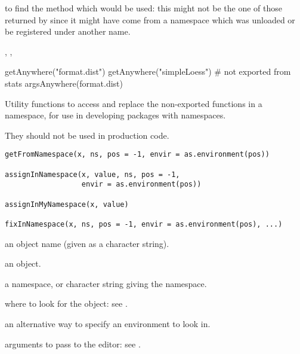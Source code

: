 %
\begin{SeeAlso}\relax
{} to find the method which would be used: this
might not be the one of those returned by  since it
might have come from a namespace which was unloaded or be registered
under another name.

,  , 
\end{SeeAlso}
%
\begin{Examples}
\begin{ExampleCode}
getAnywhere("format.dist")
getAnywhere("simpleLoess") # not exported from stats
argsAnywhere(format.dist)
\end{ExampleCode}
\end{Examples}
%
\begin{Description}\relax
Utility functions to access and replace the non-exported functions in
a namespace, for use in developing packages with namespaces.

They should not be used in production code.
\end{Description}
%
\begin{Usage}
\begin{verbatim}
getFromNamespace(x, ns, pos = -1, envir = as.environment(pos))

assignInNamespace(x, value, ns, pos = -1,
                  envir = as.environment(pos))

assignInMyNamespace(x, value)

fixInNamespace(x, ns, pos = -1, envir = as.environment(pos), ...)
\end{verbatim}
\end{Usage}
%
\begin{Arguments}
\begin{ldescription}
\item[\code{x}] an object name (given as a character string).
\item[\code{value}] an \R{} object.
\item[\code{ns}] a namespace, or character string giving the namespace.
\item[\code{pos}] where to look for the object: see .
\item[\code{envir}] an alternative way to specify an environment to look in.
\item[\code{...}] arguments to pass to the editor: see .
\end{ldescription}
\end{Arguments}
